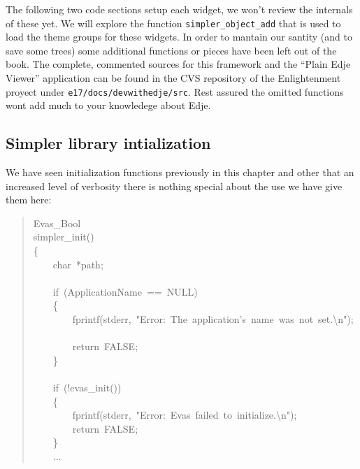 \documentclass[12pt,a4paper,english]{book}
\begin{document}
The following two code sections setup each widget, we won't review the
internals of these yet. We will explore the function \texttt{simpler{\_}object{\_}add}
that is used to load the theme groups for these widgets. In order to mantain
our santity (and to save some trees) some additional functions or pieces have
been left out of the book. The complete, commented sources for this framework
and the ``Plain Edje Viewer'' application can be found in the CVS repository of
the Enlightenment proyect under \texttt{e17/docs/devwithedje/src}. Rest assured the
omitted functions wont add much to your knowledege about Edje.



\hypertarget{simpler-library-intialization}{}
\subsection{Simpler library intialization}

We have seen initialization functions previously in this chapter and other that
an increased level of verbosity there is nothing special about the use we have
give them here:
\begin{quote}{\ttfamily \raggedright \noindent
Evas{\_}Bool~\\
simpler{\_}init()~\\
{\{}~\\
~~~~char~*path;~\\
~\\
~~~~if~(ApplicationName~==~NULL)~\\
~~~~{\{}~\\
~~~~~~~~fprintf(stderr,~"Error:~The~application's~name~was~not~set.{\textbackslash}n");~\\
~~~~~~~~return~FALSE;~\\
~~~~{\}}~\\
~\\
~~~~if~(!evas{\_}init())~\\
~~~~{\{}~\\
~~~~~~~~fprintf(stderr,~"Error:~Evas~failed~to~initialize.{\textbackslash}n");~\\
~~~~~~~~return~FALSE;~\\
~~~~{\}}~\\
~~~~...
}\end{quote}
\end{document}

